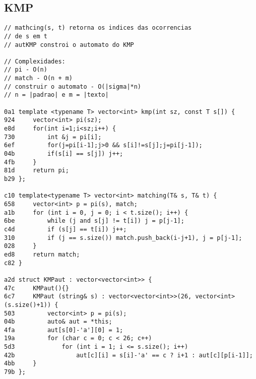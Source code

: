 \documentclass[11pt, a4paper, twoside]{article}
\begin{document}
\subsection{KMP}
\begin{lstlisting}
// mathcing(s, t) retorna os indices das ocorrencias
// de s em t
// autKMP constroi o automato do KMP

// Complexidades:
// pi - O(n)
// match - O(n + m)
// construir o automato - O(|sigma|*n)
// n = |padrao| e m = |texto|

0a1 template <typename T> vector<int> kmp(int sz, const T s[]) {
924 	vector<int> pi(sz);
e8d 	for(int i=1;i<sz;i++) {
730 		int &j = pi[i];
6ef 		for(j=pi[i-1];j>0 && s[i]!=s[j];j=pi[j-1]);
04b 		if(s[i] == s[j]) j++;
4fb 	}
81d 	return pi;
b29 };

c10 template<typename T> vector<int> matching(T& s, T& t) {
658 	vector<int> p = pi(s), match;
a1b 	for (int i = 0, j = 0; i < t.size(); i++) {
6be 		while (j and s[j] != t[i]) j = p[j-1];
c4d 		if (s[j] == t[i]) j++;
310 		if (j == s.size()) match.push_back(i-j+1), j = p[j-1];
028 	}
ed8 	return match;
c82 }

a2d struct KMPaut : vector<vector<int>> {
47c 	KMPaut(){}
6c7 	KMPaut (string& s) : vector<vector<int>>(26, vector<int>(s.size()+1)) {
503 		vector<int> p = pi(s);
04b 		auto& aut = *this;
4fa 		aut[s[0]-'a'][0] = 1;
19a 		for (char c = 0; c < 26; c++)
5d3 			for (int i = 1; i <= s.size(); i++)
42b 				aut[c][i] = s[i]-'a' == c ? i+1 : aut[c][p[i-1]];
4bb 	}
79b };
\end{lstlisting}
\end{document}
